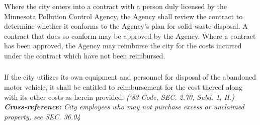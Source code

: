 \documentclass[code.tex]{subfiles}
\begin{document}
\subsubsection{}
Where the city enters into a contract with a person duly licensed by the Minnesota Pollution Control Agency, the Agency shall review the contract to determine whether it conforms to the Agency’s plan for solid waste disposal.  A contract that does so conform may be approved by the Agency.  Where a contract has been approved, the Agency may reimburse the city for the costs incurred under the contract which have not been reimbursed.
\subsubsection{}
If the city utilizes its own equipment and personnel for disposal of the abandoned motor vehicle, it shall be entitled to reimbursement for the cost thereof along with its other costs as herein provided.\newline
\emph{(‘83 Code, SEC. 2.70, Subd. 1, H.)}\\
\emph{\textbf{Cross-reference:} City employees who may not purchase excess or unclaimed property, see SEC. 36.04}
\end{document}

